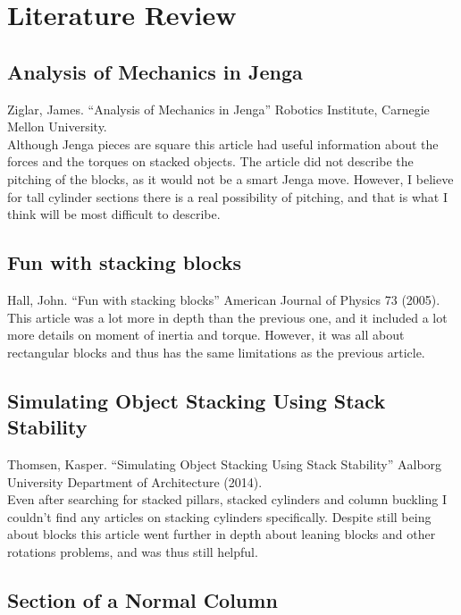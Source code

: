 \documentclass{article}
\begin{document}
\section*{Literature Review}
\subsection*{Analysis of Mechanics in Jenga}
Ziglar, James. “Analysis of Mechanics in Jenga” Robotics Institute, Carnegie Mellon University.\\

Although Jenga pieces are square this article had useful information about the forces and the torques on stacked objects. The article did not describe the pitching of the blocks, as it would not be a smart Jenga move. However, I believe for tall cylinder sections there is a real possibility of pitching, and that is what I think will be most difficult to describe.

\subsection*{Fun with stacking blocks}
Hall, John. “Fun with stacking blocks” American Journal of Physics 73 (2005).\\

This article was a lot more in depth than the previous one, and it included a lot more details on moment of inertia and torque. However, it was all about rectangular blocks and thus has the same limitations as the previous article.

\subsection*{Simulating Object Stacking Using Stack Stability}
Thomsen, Kasper. “Simulating Object Stacking Using Stack Stability” Aalborg University Department of Architecture (2014).\\

Even after searching for stacked pillars, stacked cylinders and column buckling I couldn't find any articles on stacking cylinders specifically. Despite still being about blocks this article went further in depth about leaning blocks and other rotations problems, and was thus still helpful.


\subsection*{Section of a Normal Column}
\end{document}
